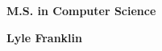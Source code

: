 \documentclass[11pt]{article}
\newcommand{\name}[1]{\hfill \textbf{#1}}
\newcommand{\program}[1]{\hfill \textbf{#1}}
\begin{document}
\program{M.S. in Computer Science}

\name{Lyle Franklin}
\end{document}
